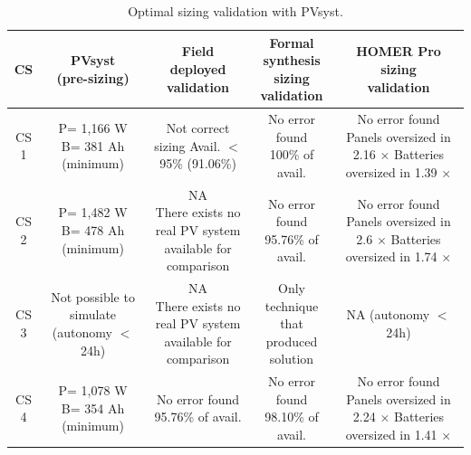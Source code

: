 \documentclass[10pt,journal,compsoc]{IEEEtran}
\begin{document}
\begin{table}
\centering
\caption{Optimal sizing validation with PVsyst.}
\label{tab2}
\begin{scriptsize}
\begin{tabular}{c|c|c|c|c}
\hline
\hline
CS & \makecell{PVsyst\\(pre-sizing)}& \makecell{Field\\deployed\\validation}& \makecell{Formal synthesis\\sizing\\validation}& \makecell{HOMER Pro\\sizing\\validation}\\
\hline
\hline
CS 1 & \makecell{P= 1,166 W\\B= 381 Ah\\(minimum)} & \makecell{Not correct sizing \\Avail. $<$ 95\%\\(91.06\%)} & \makecell{No error found \\100\% of avail.} & \makecell{No error found\\Panels oversized in 2.16 $\times$\\Batteries oversized in 1.39 $\times$}\\
\hline
CS 2 & \makecell{P= 1,482 W\\B= 478 Ah\\(minimum)} & \makecell{NA\\There exists no real PV system\\available for comparison} & \makecell{No error found \\95.76\% of avail.} & \makecell{No error found\\Panels oversized in 2.6 $\times$\\Batteries oversized in 1.74 $\times$}\\
\hline
CS 3 & \makecell{Not possible to \\simulate\\(autonomy $<$ 24h)} & \makecell{NA\\There exists no real PV system\\available for comparison} & \makecell{Only technique that\\produced solution} & \makecell{NA\\(autonomy $<$ 24h)}\\
\hline
CS 4 & \makecell{P= 1,078 W\\B= 354 Ah\\(minimum)} & \makecell{No error found \\95.76\% of avail.} & \makecell{No error found \\98.10\% of avail.} & \makecell{No error found\\Panels oversized in 2.24 $\times$\\Batteries oversized in 1.41 $\times$}\\

\end{tabular}
\end{scriptsize}
\end{table}
\end{document}
